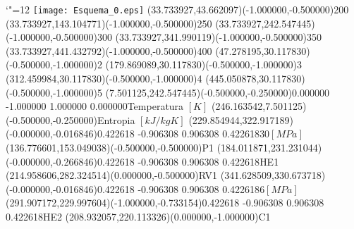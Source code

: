 \documentclass[12pt]{article}
\begin{document}
\makeatletter%
\let\ASYencoding\f@encoding%
\let\ASYfamily\f@family%
\let\ASYseries\f@series%
\let\ASYshape\f@shape%
\makeatother%
{\catcode`"=12%
\texttt{[image: Esquema\_0.eps]}%
}%
\kern -455.244094pt%
\color{ASYcolor}
\fontsize{12.000000}{14.400000}\selectfont
\usefont{\ASYencoding}{\ASYfamily}{\ASYseries}{\ASYshape}%
\ASYalign(33.733927,43.662097)(-1.000000,-0.500000){200}%
\color{ASYcolor}
\fontsize{12.000000}{14.400000}\selectfont
\ASYalign(33.733927,143.104771)(-1.000000,-0.500000){250}%
\color{ASYcolor}
\fontsize{12.000000}{14.400000}\selectfont
\ASYalign(33.733927,242.547445)(-1.000000,-0.500000){300}%
\color{ASYcolor}
\fontsize{12.000000}{14.400000}\selectfont
\ASYalign(33.733927,341.990119)(-1.000000,-0.500000){350}%
\color{ASYcolor}
\fontsize{12.000000}{14.400000}\selectfont
\ASYalign(33.733927,441.432792)(-1.000000,-0.500000){400}%
\color{ASYcolor}
\fontsize{12.000000}{14.400000}\selectfont
\ASYalign(47.278195,30.117830)(-0.500000,-1.000000){2}%
\color{ASYcolor}
\fontsize{12.000000}{14.400000}\selectfont
\ASYalign(179.869089,30.117830)(-0.500000,-1.000000){3}%
\color{ASYcolor}
\fontsize{12.000000}{14.400000}\selectfont
\ASYalign(312.459984,30.117830)(-0.500000,-1.000000){4}%
\color{ASYcolor}
\fontsize{12.000000}{14.400000}\selectfont
\ASYalign(445.050878,30.117830)(-0.500000,-1.000000){5}%
\color{ASYcolor}
\fontsize{12.000000}{14.400000}\selectfont
\ASYalignT(7.501125,242.547445)(-0.500000,-0.250000){0.000000 -1.000000 1.000000 0.000000}{Temperatura $[K]$}%
\color{ASYcolor}
\fontsize{12.000000}{14.400000}\selectfont
\ASYalign(246.163542,7.501125)(-0.500000,-0.250000){Entropia $[kJ/kg K]$}%
\color{ASYcolor}
\fontsize{12.000000}{14.400000}\selectfont
\ASYalignT(229.854944,322.917189)(-0.000000,-0.016846){0.422618 -0.906308 0.906308 0.422618}{$30 [MPa]$}%
\color{ASYcolor}
\fontsize{12.000000}{14.400000}\selectfont
\ASYalign(136.776601,153.049038)(-0.500000,-0.500000){P1}%
\color{ASYcolor}
\fontsize{12.000000}{14.400000}\selectfont
\ASYalignT(184.011871,231.231044)(-0.000000,-0.266846){0.422618 -0.906308 0.906308 0.422618}{HE1}%
\color{ASYcolor}
\fontsize{12.000000}{14.400000}\selectfont
\ASYalign(214.958606,282.324514)(0.000000,-0.500000){RV1}%
\color{ASYcolor}
\fontsize{12.000000}{14.400000}\selectfont
\ASYalignT(341.628509,330.673718)(-0.000000,-0.016846){0.422618 -0.906308 0.906308 0.422618}{$6 [MPa]$}%
\color{ASYcolor}
\fontsize{12.000000}{14.400000}\selectfont
\ASYalignT(291.907172,229.997604)(-1.000000,-0.733154){0.422618 -0.906308 0.906308 0.422618}{HE2}%
\color{ASYcolor}
\fontsize{12.000000}{14.400000}\selectfont
\ASYalign(208.932057,220.113326)(0.000000,-1.000000){C1}%
\end{document}
